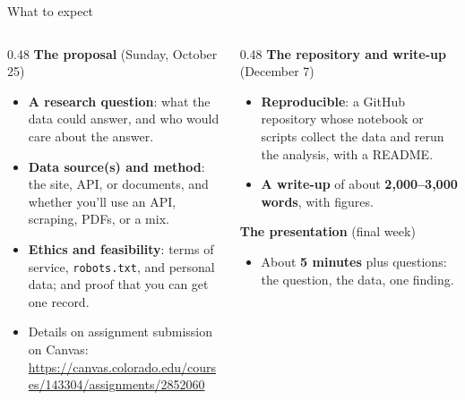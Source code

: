 \documentclass[9pt,aspectratio=169]{beamer}
\begin{document}
\begin{frame}{What to expect}
    \begin{columns}[T]
        \begin{column}{0.48\textwidth}
            \textbf{The proposal} (Sunday, October 25)
            \begin{itemize}\small
                \item \textbf{A research question}: what the data could answer, and who would care about the answer.
                \item \textbf{Data source(s) and method}: the site, API, or documents, and whether you'll use an API, scraping, PDFs, or a mix.
                \item \textbf{Ethics and feasibility}: terms of service, \texttt{robots.txt}, and personal data; and proof that you can get one record.
                \item Details on assignment submission on Canvas: \url{https://canvas.colorado.edu/courses/143304/assignments/2852060}
            \end{itemize}
        \end{column}
        \begin{column}{0.48\textwidth}
            \textbf{The repository and write-up} (December 7)
            \begin{itemize}\small
                \item \textbf{Reproducible}: a GitHub repository whose notebook or scripts collect the data and rerun the analysis, with a README.
                \item \textbf{A write-up} of about \textbf{2,000--3,000 words}, with figures.
            \end{itemize}
            \medskip
            \textbf{The presentation} (final week)
            \begin{itemize}\small
                \item About \textbf{5 minutes} plus questions: the question, the data, one finding.
            \end{itemize}
        \end{column}
    \end{columns}
\end{frame}
\end{document}

